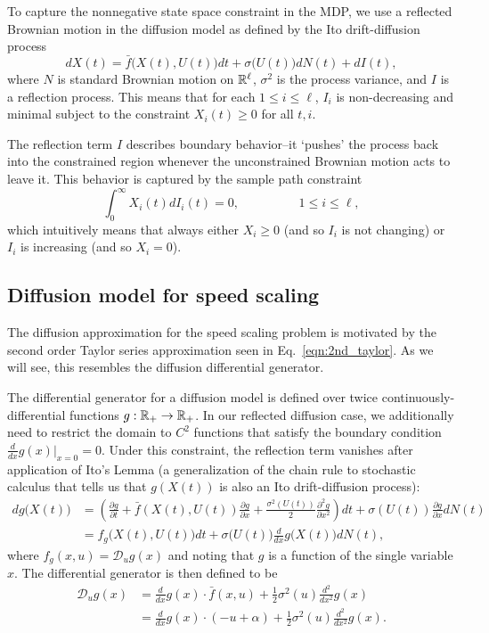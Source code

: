 \documentclass[11pt]{article}
\begin{document}
To capture the nonnegative state space constraint in the MDP, we use a reflected Brownian motion in the diffusion model as defined by the Ito drift-diffusion process
$$dX(t) = \bar f\big( X(t), U(t)\big)dt + \sigma\big( U(t)\big) dN(t) + dI(t),$$
where $N$ is standard Brownian motion on $\mathbb{R}^\ell$, $\sigma^2$ is the process variance, and $I$ is a reflection process. This means that for each $1\leq i \leq \ell$, $I_i$ is non-decreasing and minimal subject to the constraint $X_i(t) \geq 0$ for all $t,i$.

The reflection term $I$ describes boundary behavior--it `pushes' the process back into the constrained region whenever the unconstrained Brownian motion acts to leave it. This behavior is captured by the sample path constraint
$$\int_0^\infty X_i(t) dI_i(t) = 0, \hspace{2cm} 1\leq i \leq \ell,$$
which intuitively means that always either $X_i \geq 0$ (and so $I_i$ is not changing) or $I_i$ is increasing (and so $X_i = 0$).





\subsection{Diffusion model for speed scaling}

The diffusion approximation for the speed scaling problem is motivated by the second order Taylor series approximation seen in Eq.~\ref{eqn:2nd_taylor}. As we will see, this resembles the diffusion differential generator.

The differential generator for a diffusion model is defined over twice continuously-differential functions $g:\mathbb{R}_+ \rightarrow \mathbb{R}_+$. In our reflected diffusion case, we additionally need to restrict the domain to $C^2$ functions that satisfy the boundary condition $\frac{d}{dx} g(x) \vert_{x=0} = 0$. Under this constraint, the reflection term vanishes after application of Ito's Lemma (a generalization of the chain rule to stochastic calculus that tells us that $g(X(t))$ is also an Ito drift-diffusion process):
$$\begin{aligned}
dg\Big( X(t) \Big) &= \left( \frac{\partial g}{\partial t} + \bar f(X(t),U(t)) \frac{\partial g}{\partial x} + \frac{\sigma^2(U(t))}{2} \frac{\partial^2 g}{\partial x^2} \right)dt + \sigma(U(t)) \frac{\partial g}{\partial x} dN(t) \\
	&= f_g \Big( X(t), U(t) \Big)dt + \sigma\Big( U(t) \Big) \frac{d}{dx} g\Big( X(t)\Big) dN(t),
\end{aligned}$$
where $f_g(x,u) = \mathcal{D}_u g(x)$ and noting that $g$ is a function of the single variable $x$.
The differential generator is then defined to be
$$\begin{aligned}
\mathcal{D}_u g(x) &= \frac{d}{dx} g(x) \cdot \bar f(x,u) + \frac{1}{2} \sigma^2(u) \frac{d^2}{dx^2} g(x) \\
	&= \frac{d}{dx} g(x) \cdot (-u + \alpha) + \frac{1}{2} \sigma^2(u) \frac{d^2}{dx^2} g(x).
\end{aligned}$$
\end{document}

